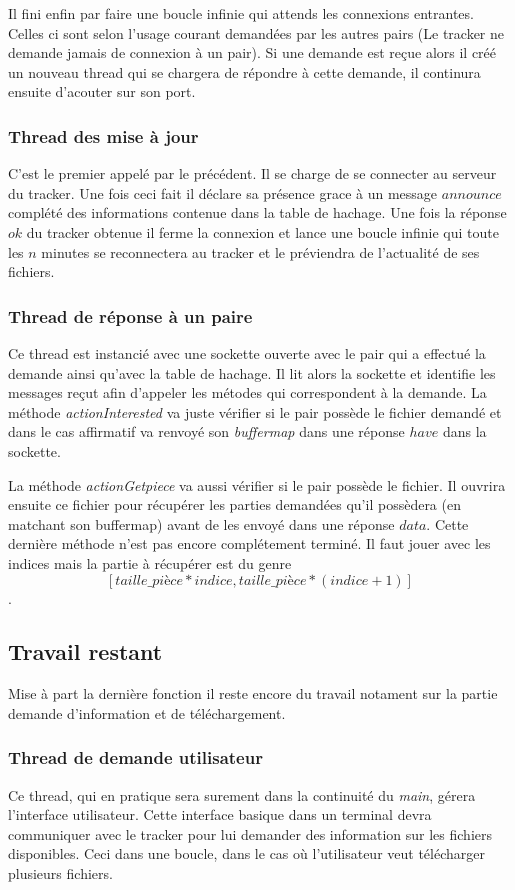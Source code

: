 Il fini enfin par faire une boucle infinie qui attends les connexions entrantes. Celles ci sont selon l'usage courant demandées par les autres pairs (Le tracker ne demande jamais de connexion à un pair). Si une demande est reçue alors il créé un nouveau thread qui se chargera de répondre à cette demande, il continura ensuite d'acouter sur son port.

\subsubsection*{Thread des mise à jour}
C'est le premier appelé par le précédent. Il se charge de se connecter au serveur du tracker. Une fois ceci fait il déclare sa présence grace à un message $announce$ complété des informations contenue dans la table de hachage. 
Une fois la réponse $ok$ du tracker obtenue il ferme la connexion et lance une boucle infinie qui toute les $n$ minutes se reconnectera au tracker et le préviendra de l'actualité de ses fichiers. 

\subsubsection*{Thread de réponse à un paire}
Ce thread est instancié avec une sockette ouverte avec le pair qui a effectué la demande ainsi qu'avec la table de hachage. Il lit alors la sockette et identifie les messages reçut afin d'appeler les métodes qui correspondent à la demande. La méthode \textit{actionInterested} va juste vérifier si le pair possède le fichier demandé et dans le cas affirmatif va renvoyé son \textit{buffermap} dans une réponse $have$ dans la sockette.

La méthode \textit{actionGetpiece} va aussi vérifier si le pair possède le fichier. Il ouvrira ensuite ce fichier pour récupérer les parties demandées qu'il possèdera (en matchant son buffermap) avant de les envoyé dans une réponse $data$.
Cette dernière méthode n'est pas encore complétement terminé. Il faut jouer avec les indices mais la partie à récupérer est du genre $$[taille\_pièce*indice,taille\_pièce*(indice+1)]$$.


\subsection{Travail restant}
Mise à part la dernière fonction il reste encore du travail notament sur la partie demande d'information et de téléchargement.

\subsubsection*{Thread de demande utilisateur} 
Ce thread, qui en pratique sera surement dans la continuité du \textit{main}, gérera l'interface utilisateur. Cette interface basique dans un terminal devra communiquer avec le tracker pour lui demander des information sur les fichiers disponibles. Ceci dans une boucle, dans le cas où l'utilisateur veut télécharger plusieurs fichiers.


